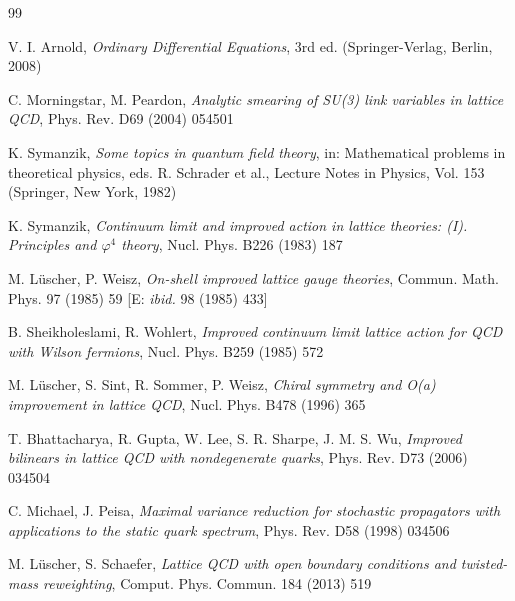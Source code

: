 \begin{thebibliography}{99}

V. I. Arnold,
{\it Ordinary Differential Equations}, 3rd ed. (Springer-Verlag, Berlin, 2008)



C. Morningstar, M. Peardon, 
{\it Analytic smearing of SU(3) link variables in lattice QCD},
Phys. Rev. D69 (2004) 054501



K. Symanzik, 
{\it Some topics in quantum field theory},
in: Mathematical problems in theoretical physics, eds. R. Schrader
et al., Lecture Notes in Physics, Vol. 153 (Springer, New York, 1982)

K. Symanzik,
{\it Continuum limit and improved action in lattice theories:
(I). Principles and $\varphi^4$ theory},
Nucl. Phys. B226 (1983) 187



M. L\"uscher, P. Weisz,
{\it On-shell improved lattice gauge theories},
Commun. Math. Phys. 97 (1985) 59 [E: {\it ibid.} 98 (1985) 433]



B. Sheikholeslami, R. Wohlert, 
{\it Improved continuum limit lattice action for QCD with Wilson fermions},
Nucl. Phys. B259 (1985) 572

M. L\"uscher, S. Sint, R. Sommer, P. Weisz,
{\it Chiral symmetry and O(a) improvement in lattice QCD},
Nucl. Phys. B478 (1996) 365



T. Bhattacharya, R. Gupta, W. Lee, S. R. Sharpe, J. M. S. Wu,
{\it Improved bilinears in lattice QCD with nondegenerate quarks},
Phys. Rev. D73 (2006) 034504



C. Michael, J. Peisa,
{\it Maximal variance reduction for stochastic propagators with 
applications to the static quark spectrum},
Phys. Rev. D58 (1998) 034506



M. L\"uscher, S. Schaefer,
{\it  	
Lattice QCD with open boundary conditions and twisted-mass reweighting},
Comput. Phys. Commun. 184 (2013) 519



\end{thebibliography}
